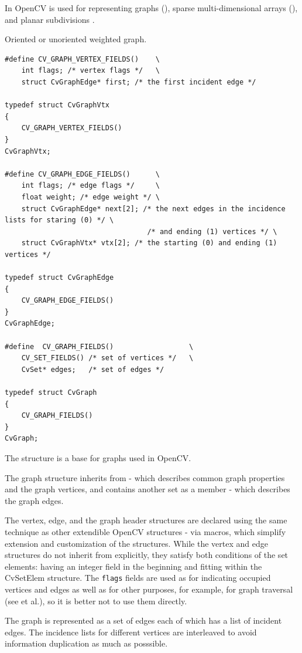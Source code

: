 In OpenCV  is used for representing graphs (),
sparse multi-dimensional arrays (), and planar subdivisions
.


\label{CvGraph}
Oriented or unoriented weighted graph.

\begin{lstlisting}
#define CV_GRAPH_VERTEX_FIELDS()    \
    int flags; /* vertex flags */   \
    struct CvGraphEdge* first; /* the first incident edge */

typedef struct CvGraphVtx
{
    CV_GRAPH_VERTEX_FIELDS()
}
CvGraphVtx;

#define CV_GRAPH_EDGE_FIELDS()      \
    int flags; /* edge flags */     \
    float weight; /* edge weight */ \
    struct CvGraphEdge* next[2]; /* the next edges in the incidence lists for staring (0) */ \
                                  /* and ending (1) vertices */ \
    struct CvGraphVtx* vtx[2]; /* the starting (0) and ending (1) vertices */

typedef struct CvGraphEdge
{
    CV_GRAPH_EDGE_FIELDS()
}
CvGraphEdge;

#define  CV_GRAPH_FIELDS()                  \
    CV_SET_FIELDS() /* set of vertices */   \
    CvSet* edges;   /* set of edges */

typedef struct CvGraph
{
    CV_GRAPH_FIELDS()
}
CvGraph;

\end{lstlisting}

The structure  is a base for graphs used in OpenCV.

The graph structure inherits from  - which describes common graph properties and the graph vertices, and contains another set as a member - which describes the graph edges.

The vertex, edge, and the graph header structures are declared using the
same technique as other extendible OpenCV structures - via macros, which
simplify extension and customization of the structures. While the vertex
and edge structures do not inherit from  explicitly, they
satisfy both conditions of the set elements: having an integer field in
the beginning and fitting within the CvSetElem structure. The \texttt{flags} fields are
used as for indicating occupied vertices and edges as well as for other
purposes, for example, for graph traversal (see \cross{cvCreateGraphScanner}
et al.), so it is better not to use them directly.

The graph is represented as a set of edges each of which has a list of
incident edges. The incidence lists for different vertices are interleaved
to avoid information duplication as much as posssible.

